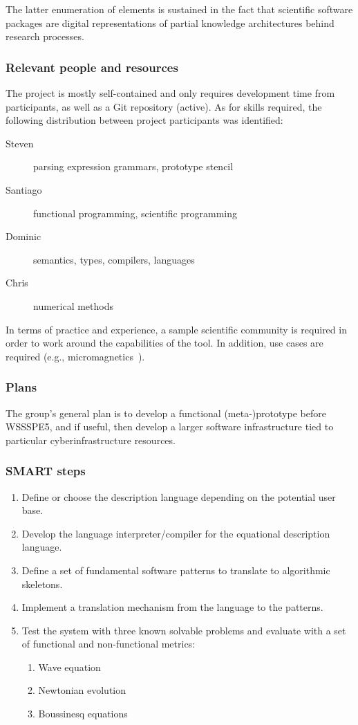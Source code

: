 The latter enumeration of elements is sustained in the fact that scientific
software packages are digital representations of partial knowledge architectures
behind research processes.

\subsubsection{Relevant people and resources}

The project is mostly self-contained and only requires development time from
participants, as well as a Git repository (active). As for skills required, the
following distribution between project participants was identified:

\begin{description}
  \item[Steven] parsing expression grammars, prototype stencil
  \item[Santiago] functional programming, scientific programming
  \item[Dominic] semantics, types, compilers, languages
  \item[Chris] numerical methods
\end{description}

In terms of practice and experience, a sample scientific community is required
in order to work around the capabilities of the tool. In addition, use cases
are required (e.g., micromagnetics~\cite{fischbacher2007systematic}).

\subsubsection{Plans}

The group's general plan is to develop a functional (meta-)prototype before WSSSPE5, and
if useful, then develop a larger software infrastructure tied to
particular cyberinfrastructure resources.

\subsubsection{SMART steps}

\begin{enumerate}
  \item Define or choose the description language depending on the potential user
  base.
  \item Develop the language interpreter/compiler for the equational description
  language.
  \item Define a set of fundamental software patterns to translate to algorithmic
  skeletons.
  \item Implement a translation mechanism from the language to the patterns.
  \item Test the system with three known solvable problems and evaluate with a
  set of functional and non-functional metrics:
  \begin{enumerate}
    \item Wave equation
    \item Newtonian evolution
    \item Boussinesq equations
  \end{enumerate}
\end{enumerate}

